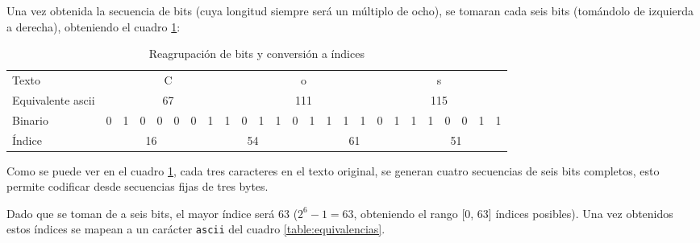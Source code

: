 \documentclass[titlepage,a4paper]{article}
\begin{document}
Una vez obtenida la secuencia de bits (cuya longitud siempre será un múltiplo de ocho), se tomaran cada seis bits (tomándolo de izquierda a derecha), obteniendo el cuadro \ref{table:paso_2}:

\begin{table}[H]
\centering
\setlength{\tabcolsep}{4pt}
\begin{tabular}{l|cccccc||cc|cccc||cccc|cc||cccccc}
Texto             & \multicolumn{8}{c|}{C}        & \multicolumn{8}{c|}{o}        & \multicolumn{8}{c}{s}        \\
Equivalente ascii & \multicolumn{8}{c|}{67}       & \multicolumn{8}{c|}{111}      & \multicolumn{8}{c}{115}      \\
Binario           &0& 1 & 0 & 0 & 0 & 0 & 1 & 1 & 0 & 1 & 1 & 0 & 1 & 1 & 1 & 1 & 0 & 1 & 1 & 1 & 0 & 0 & 1 & 1 \\
Índice & \multicolumn{6}{c||}{16} & \multicolumn{6}{c||}{54} & \multicolumn{6}{c||}{61} & \multicolumn{6}{c}{51}

\end{tabular}
\caption{Reagrupación de bits y conversión a índices}
\label{table:paso_2}
\centering
\end{table}

Como se puede ver en el cuadro \ref{table:paso_2}, cada tres caracteres en el texto original, se generan cuatro secuencias de seis bits completos, esto permite codificar desde secuencias fijas de tres bytes. 

Dado que se toman de a seis bits, el mayor índice será 63 ($2^{6} - 1 = 63$, obteniendo el rango [0, 63] índices posibles). Una vez obtenidos estos índices se mapean a un carácter \verb|ascii| del cuadro \ref{table:equivalencias}.
\end{document}
